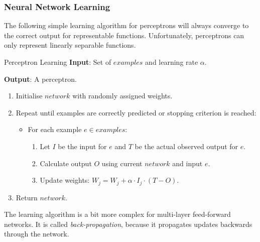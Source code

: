 \documentclass[english]{panikzettel}
\begin{document}
\subsubsection{Neural Network Learning}

The following simple learning algorithm for perceptrons will always converge to the correct output for representable functions.
Unfortunately, perceptrons can only represent linearly separable functions.

\begin{algo}{Perceptron Learning}
\textbf{Input}: Set of $examples$ and learning rate $\alpha$.

\textbf{Output}: A perceptron.
\tcblower
\begin{enumerate}
    \item Initialise $network$ with randomly assigned weights.
    \item Repeat until examples are correctly predicted or stopping criterion is reached:
        \begin{itemize}
            \item For each example $e \in examples$:
                \begin{enumerate}
                    \item Let $I$ be the input for $e$ and $T$ be the actual observed output for $e$.
                    \item Calculate output $O$ using current $network$ and input $e$.
                    \item Update weights: $W_j = W_j + \alpha \cdot I_j \cdot (T - O)$.
                \end{enumerate}
        \end{itemize}
    \item Return $network$.
\end{enumerate}
\end{algo}

The learning algorithm is a bit more complex for multi-layer feed-forward networks.
It is called \emph{back-propagation}, because it propagates updates backwards through the network.
\end{document}
